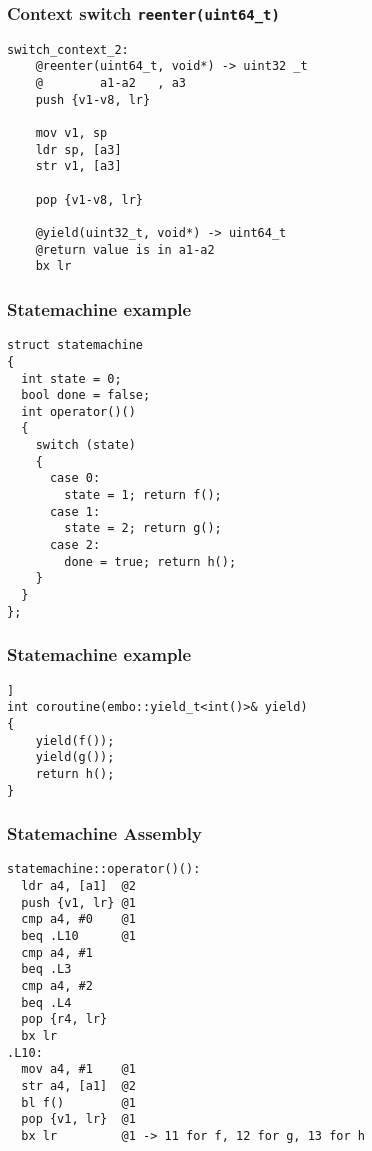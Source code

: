 \documentclass{beamer}
\begin{document}
\begin{frame}[fragile]
\frametitle{Context switch \lstinline{reenter(uint64_t)}}
\begin{block}{}
\begin{lstlisting}[language=ASM, basicstyle=\small]
switch_context_2:
    @reenter(uint64_t, void*) -> uint32	_t
    @        a1-a2   , a3
    push {v1-v8, lr}

    mov v1, sp
    ldr sp, [a3]
    str v1, [a3]

    pop {v1-v8, lr}

    @yield(uint32_t, void*) -> uint64_t
    @return value is in a1-a2
    bx lr
\end{lstlisting}
\end{block}
\end{frame}



\begin{frame}[fragile]
\frametitle{Statemachine example}
\begin{block}{}
\begin{lstlisting}[basicstyle=\small]
struct statemachine
{
  int state = 0;
  bool done = false;
  int operator()()
  {
    switch (state)
    {
      case 0:        
        state = 1; return f();
      case 1:
        state = 2; return g(); 
      case 2:
        done = true; return h();
    }
  }
};
\end{lstlisting}
\end{block}
\end{frame}

\begin{frame}[fragile]
\frametitle{Statemachine example}
\begin{block}{}
\begin{lstlisting}[basicstyle=\small]]
int coroutine(embo::yield_t<int()>& yield)
{
    yield(f());
    yield(g());
    return h();
}
\end{lstlisting}
\end{block}
\end{frame}

\begin{frame}[fragile]
\frametitle{Statemachine Assembly}

\begin{block}{}
\begin{lstlisting}[language=ASM, basicstyle=\small]
statemachine::operator()():
  ldr a4, [a1]  @2
  push {v1, lr} @1
  cmp a4, #0    @1
  beq .L10      @1 
  cmp a4, #1
  beq .L3
  cmp a4, #2
  beq .L4
  pop {r4, lr}
  bx lr
.L10:
  mov a4, #1    @1
  str a4, [a1]  @2
  bl f()        @1
  pop {v1, lr}  @1
  bx lr         @1 -> 11 for f, 12 for g, 13 for h
\end{lstlisting}
\end{block}
\end{frame}
\end{document}
